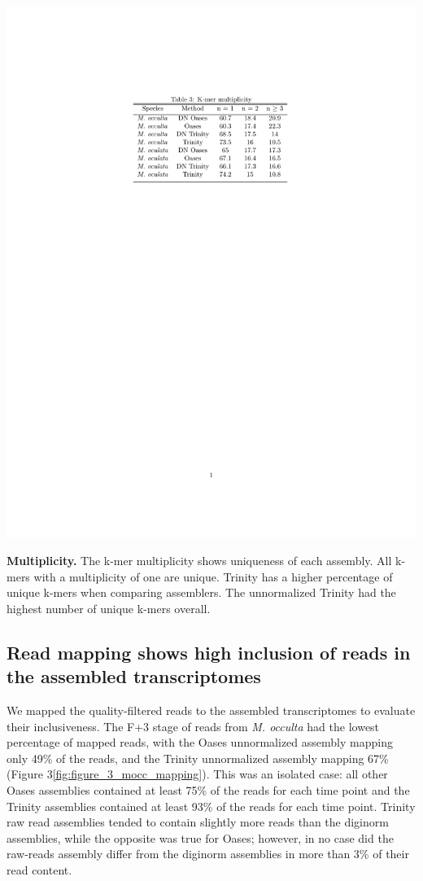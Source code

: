 \begin{table}[tbp]
\centering
\includegraphics[width=0.4\linewidth]{manuscript/Table_3_multiplicity.pdf}
\caption{\textbf{Multiplicity.} The k-mer multiplicity shows uniqueness of each assembly. All k-mers with a multiplicity of one are unique. Trinity has a higher percentage of unique k-mers when comparing assemblers. The unnormalized Trinity had the highest number of unique k-mers overall.}
\label{fig:multiplicity}
\end{table}

\subsection{Read mapping shows high inclusion of reads in the assembled transcriptomes}
	We mapped the quality-filtered reads to the assembled transcriptomes to evaluate their inclusiveness. The F+3 stage of reads from \textit{M. occulta} had the lowest percentage of mapped reads, with the Oases unnormalized assembly mapping only 49\% of the reads, and the Trinity unnormalized assembly mapping 67\% (Figure 3\ref{fig:figure_3_mocc_mapping}). This was an isolated case: all other Oases assemblies contained at least 75\% of the reads for each time point and the Trinity assemblies contained at least 93\% of the reads for each time point. Trinity raw read assemblies tended to contain slightly more reads than the diginorm assemblies, while the opposite was true for Oases; however, in no case did the raw-reads assembly differ from the diginorm assemblies in more than 3\% of their read content.
\setcounter{subfigure}{0}
	
